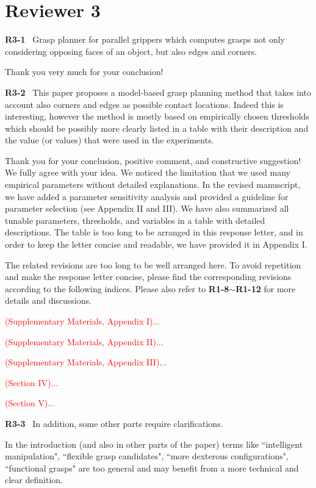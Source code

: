 \documentclass[journal]{IEEEtran}
\newcommand{\rev}[1]{\textcolor{red}{#1}}
\begin{document}
\section{Reviewer 3}
\noindent
{\textbf{\color{black}R3-1}\color{gray}~
Grasp planner for parallel grippers which computes grasps not only considering opposing faces of an object, but also edges and corners.
}

Thank you very much for your conclusion!
\bigskip

\noindent
{\textbf{\color{black}R3-2}\color{gray}~
This paper proposes a model-based grasp planning method that takes into account also corners and edges as possible contact locations. Indeed this is interesting, however the method is mostly based on empirically chosen thresholds which should be possibly more clearly listed in a table with their description and the value (or values) that were used in the experiments.
}

Thank you for your conclusion, positive comment, and constructive suggestion! 
We fully agree with your idea. We noticed the limitation that we used many empirical parameters without detailed explanations. 
In the revised manuscript, we have added a parameter sensitivity analysis and provided a guideline for parameter selection (see Appendix II and III). We have also summarized all tunable parameters, thresholds, and variables in a table with detailed descriptions. The table is too long to be arranged in this response letter, and in order to keep the letter concise and readable, we have provided it in Appendix I.

The related revisions are too long to be well arranged here. To avoid repetition and make the response letter concise, please find the corresponding revisions according to the following indices. Please also refer to \textbf{R1-8}$\sim$\textbf{R1-12} for more details and discussions. 

\rev{(Supplementary Materials, Appendix I)...}

\rev{(Supplementary Materials, Appendix II)...}

\rev{(Supplementary Materials, Appendix III)...}

\rev{(Section IV)...}

\rev{(Section V)...}


\bigskip

\noindent
{\textbf{\color{black}R3-3}\color{gray}~
In addition, some other parts require clarifications.

In the introduction (and also in other parts of the paper) terms like ``intelligent manipulation", ``flexible grasp candidates", ``more dexterous configurations", ``functional grasps" are too general and may benefit from a more technical and clear definition.
}
\end{document}
